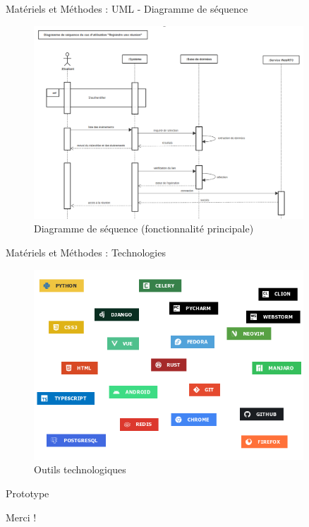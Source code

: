 \documentclass{beamer}
\begin{document}
\begin{frame}{Matériels et Méthodes : \small{UML} - \footnotesize{Diagramme de séquence}}
  \begin{figure}[H]
    \centering
    \includegraphics[width=0.9\textwidth]{../../images/join-meet-sequence-diag.png}
    \caption{Diagramme de séquence (fonctionnalité principale)}
\end{figure}
\end{frame}

\begin{frame}{Matériels et Méthodes : \small{Technologies}}
  \begin{figure}[H]
    \centering
    \includegraphics[width=0.9\textwidth]{tech-stack}
    \caption{Outils technologiques}
\end{figure}
\end{frame}

\begin{frame}
  \begin{center}
  \Huge{Prototype}
  \end{center}
\end{frame}





\begin{frame}
  \begin{center}
  \Huge{Merci !}
  \end{center}

\end{frame}
\end{document}
